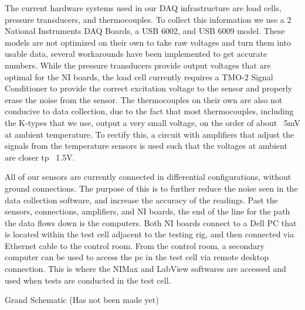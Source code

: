 \documentclass[10pt,a4paper]{article}
\begin{document}
\par The current hardware systems used in our DAQ infrastructure are load cells, pressure transducers, and thermocouples. To collect this information we use a 2 National Instruments DAQ Boards, a USB 6002, and USB 6009 model. These models are not optimized on their own to take raw voltages and turn them into usable data, several workarounds have been implemented to get accurate numbers. While the pressure transducers provide output voltages that are optimal for the NI boards, the load cell currently requires a TMO-2 Signal Conditioner to provide the correct excitation voltage to the sensor and properly erase the noise from the sensor. The thermocouples on their own are also not conducive to data collection, due to the fact that most thermocouples, including the K-types that we use, output a very small voltage, on the order of about ~5mV at ambient temperature. To rectify this, a circuit with amplifiers that adjust the signals from the temperature sensors is used such that the voltages at ambient are closer tp ~1.5V.
\par All of our sensors are currently connected in differential configurations, without ground connections. The purpose of this is to further reduce the noise seen in the data collection software, and increase the accuracy of the readings. Past the sensors, connections, amplifiers, and NI boards, the end of the line for the path the data flows down is the computers. Both NI boards connect to a Dell PC that is located within the test cell adjacent to the testing rig, and then connected via Ethernet cable to the control room. From the control room, a secondary computer can be used to access the pc in the test cell via remote desktop connection. This is where the NIMax and LabView softwares are accessed and used when tests are conducted in the test cell.


\par Grand Schematic (Has not been made yet)
\end{document}
